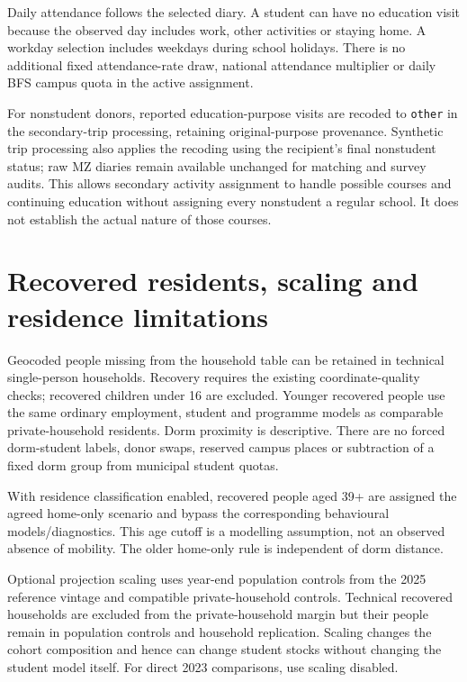 \documentclass[11pt,a4paper]{article}
\newcommand{\code}[1]{\nolinkurl{#1}}
\begin{document}
Daily attendance follows the selected diary. A student can have no education
visit because the observed day includes work, other activities or staying
home. A workday selection includes weekdays during school holidays. There is
no additional fixed attendance-rate draw, national attendance multiplier or
daily BFS campus quota in the active assignment.

For nonstudent donors, reported education-purpose visits are recoded to
\code{other} in the secondary-trip processing, retaining original-purpose
provenance. Synthetic trip processing also applies the recoding using the
recipient's final nonstudent status; raw MZ diaries remain available unchanged
for matching and survey audits. This allows secondary activity assignment to handle possible
courses and continuing education without assigning every nonstudent a regular
school. It does not establish the actual nature of those courses.

\section{Recovered residents, scaling and residence limitations}

Geocoded people missing from the household table can be retained in technical
single-person households. Recovery requires the existing coordinate-quality
checks; recovered children under 16 are excluded. Younger recovered people
use the same ordinary employment, student and programme models as comparable
private-household residents. Dorm proximity is descriptive. There are no
forced dorm-student labels, donor swaps, reserved campus places or subtraction
of a fixed dorm group from municipal student quotas.

With residence classification enabled, recovered people aged 39+ are assigned
the agreed home-only scenario and bypass the corresponding behavioural
models/diagnostics. This age cutoff is a modelling assumption, not an observed
absence of mobility. The older home-only rule is independent of dorm distance.

Optional projection scaling uses year-end population controls from the
2025 reference vintage and compatible private-household controls. Technical
recovered households are excluded from the private-household margin but their
people remain in population controls and household replication. Scaling changes
the cohort composition and hence can change student stocks without changing
the student model itself. For direct 2023 comparisons, use scaling disabled.
\end{document}
